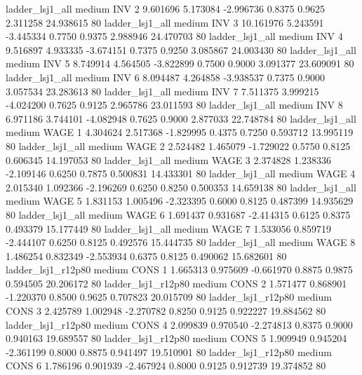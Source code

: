        ladder_lsj1_all     medium      INV                 2  9.601696 5.173084 -2.996736 0.8375 0.9625  2.311258   24.938615 80
       ladder_lsj1_all     medium      INV                 3 10.161976 5.243591 -3.445334 0.7750 0.9375  2.988946   24.470703 80
       ladder_lsj1_all     medium      INV                 4  9.516897 4.933335 -3.674151 0.7375 0.9250  3.085867   24.003430 80
       ladder_lsj1_all     medium      INV                 5  8.749914 4.564505 -3.822899 0.7500 0.9000  3.091377   23.609091 80
       ladder_lsj1_all     medium      INV                 6  8.094487 4.264858 -3.938537 0.7375 0.9000  3.057534   23.283613 80
       ladder_lsj1_all     medium      INV                 7  7.511375 3.999215 -4.024200 0.7625 0.9125  2.965786   23.011593 80
       ladder_lsj1_all     medium      INV                 8  6.971186 3.744101 -4.082948 0.7625 0.9000  2.877033   22.748784 80
       ladder_lsj1_all     medium     WAGE                 1  4.304624 2.517368 -1.829995 0.4375 0.7250  0.593712   13.995119 80
       ladder_lsj1_all     medium     WAGE                 2  2.524482 1.465079 -1.729022 0.5750 0.8125  0.606345   14.197053 80
       ladder_lsj1_all     medium     WAGE                 3  2.374828 1.238336 -2.109146 0.6250 0.7875  0.500831   14.433301 80
       ladder_lsj1_all     medium     WAGE                 4  2.015340 1.092366 -2.196269 0.6250 0.8250  0.500353   14.659138 80
       ladder_lsj1_all     medium     WAGE                 5  1.831153 1.005496 -2.323395 0.6000 0.8125  0.487399   14.935629 80
       ladder_lsj1_all     medium     WAGE                 6  1.691437 0.931687 -2.414315 0.6125 0.8375  0.493379   15.177449 80
       ladder_lsj1_all     medium     WAGE                 7  1.533056 0.859719 -2.444107 0.6250 0.8125  0.492576   15.444735 80
       ladder_lsj1_all     medium     WAGE                 8  1.486254 0.832349 -2.553934 0.6375 0.8125  0.490062   15.682601 80
    ladder_lsj1_r12p80     medium     CONS                 1  1.665313 0.975609 -0.661970 0.8875 0.9875  0.594505   20.206172 80
    ladder_lsj1_r12p80     medium     CONS                 2  1.571477 0.868901 -1.220370 0.8500 0.9625  0.707823   20.015709 80
    ladder_lsj1_r12p80     medium     CONS                 3  2.425789 1.002948 -2.270782 0.8250 0.9125  0.922227   19.884562 80
    ladder_lsj1_r12p80     medium     CONS                 4  2.099839 0.970540 -2.274813 0.8375 0.9000  0.940163   19.689557 80
    ladder_lsj1_r12p80     medium     CONS                 5  1.909949 0.945204 -2.361199 0.8000 0.8875  0.941497   19.510901 80
    ladder_lsj1_r12p80     medium     CONS                 6  1.786196 0.901939 -2.467924 0.8000 0.9125  0.912739   19.374852 80
